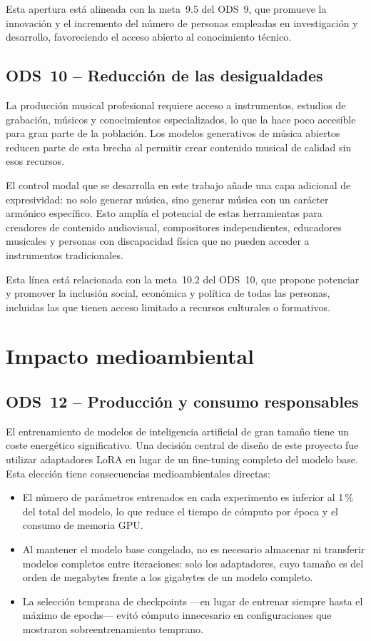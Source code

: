 \documentclass[%
    school=etsisi,%
    type=pfg,%
    degree=61CD,%
]{upm-report}
\begin{document}
Esta apertura est\'a alineada con la meta~9.5 del ODS~9, que promueve la innovaci\'on y el incremento del n\'umero de personas empleadas en investigaci\'on y desarrollo, favoreciendo el acceso abierto al conocimiento t\'ecnico.

\subsection{ODS~10 -- Reducci\'on de las desigualdades}

La producci\'on musical profesional requiere acceso a instrumentos, estudios de grabaci\'on, m\'usicos y conocimientos especializados, lo que la hace poco accesible para gran parte de la poblaci\'on. Los modelos generativos de m\'usica abiertos reducen parte de esta brecha al permitir crear contenido musical de calidad sin esos recursos.

El control modal que se desarrolla en este trabajo a\~nade una capa adicional de expresividad: no solo generar m\'usica, sino generar m\'usica con un car\'acter arm\'onico espec\'ifico. Esto ampl\'ia el potencial de estas herramientas para creadores de contenido audiovisual, compositores independientes, educadores musicales y personas con discapacidad f\'isica que no pueden acceder a instrumentos tradicionales.

Esta l\'inea est\'a relacionada con la meta~10.2 del ODS~10, que propone potenciar y promover la inclusi\'on social, econ\'omica y pol\'itica de todas las personas, incluidas las que tienen acceso limitado a recursos culturales o formativos.

\section{Impacto medioambiental}

\subsection{ODS~12 -- Producci\'on y consumo responsables}

El entrenamiento de modelos de inteligencia artificial de gran tama\~no tiene un coste energ\'etico significativo. Una decisi\'on central de dise\~no de este proyecto fue utilizar adaptadores LoRA en lugar de un fine-tuning completo del modelo base. Esta elecci\'on tiene consecuencias medioambientales directas:

\begin{itemize}
    \item El n\'umero de par\'ametros entrenados en cada experimento es inferior al 1\,\% del total del modelo, lo que reduce el tiempo de c\'omputo por \'epoca y el consumo de memoria GPU.
    \item Al mantener el modelo base congelado, no es necesario almacenar ni transferir modelos completos entre iteraciones: solo los adaptadores, cuyo tama\~no es del orden de megabytes frente a los gigabytes de un modelo completo.
    \item La selecci\'on temprana de checkpoints ---en lugar de entrenar siempre hasta el m\'aximo de epochs--- evit\'o c\'omputo innecesario en configuraciones que mostraron sobreentrenamiento temprano.
\end{itemize}
\end{document}
